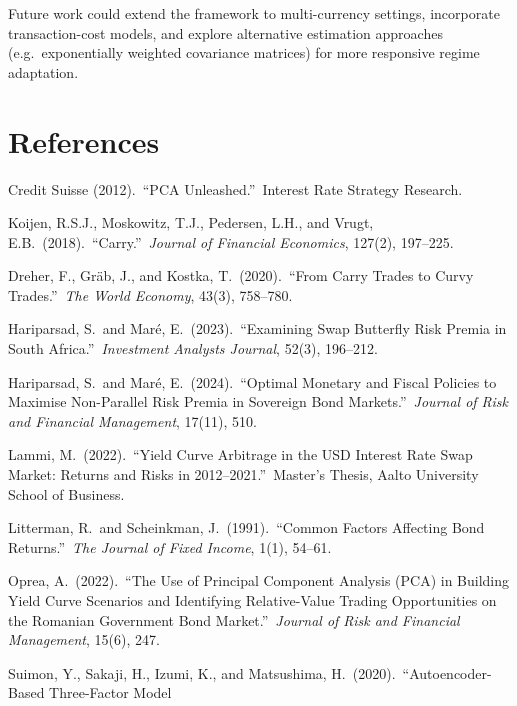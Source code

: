 \documentclass[11pt,a4paper]{article}
\begin{document}
Future work could extend the framework to multi-currency settings,
incorporate transaction-cost models, and explore alternative estimation
approaches (e.g.\ exponentially weighted covariance matrices) for more
responsive regime adaptation.


\section*{References}

\begin{enumerate}[label={[\arabic*]},leftmargin=*,itemsep=2pt]
  \item Credit Suisse (2012).\ ``PCA Unleashed.''\ Interest Rate Strategy
        Research.
  \item Koijen, R.S.J., Moskowitz, T.J., Pedersen, L.H., and Vrugt, E.B.~(2018).\
        ``Carry.''\ \textit{Journal of Financial Economics}, 127(2), 197--225.
  \item Dreher, F., Gr\"{a}b, J., and Kostka, T.~(2020).\ ``From Carry
        Trades to Curvy Trades.''\ \textit{The World Economy}, 43(3),
        758--780.
  \item Hariparsad, S.\ and Mar\'{e}, E.~(2023).\ ``Examining Swap Butterfly
        Risk Premia in South Africa.''\ \textit{Investment Analysts
        Journal}, 52(3), 196--212.
  \item Hariparsad, S.\ and Mar\'{e}, E.~(2024).\ ``Optimal Monetary and
        Fiscal Policies to Maximise Non-Parallel Risk Premia in Sovereign
        Bond Markets.''\ \textit{Journal of Risk and Financial
        Management}, 17(11), 510.
  \item Lammi, M.~(2022).\ ``Yield Curve Arbitrage in the USD Interest
        Rate Swap Market: Returns and Risks in 2012--2021.''\ Master's
        Thesis, Aalto University School of Business.
  \item Litterman, R.\ and Scheinkman, J.~(1991).\ ``Common Factors
        Affecting Bond Returns.''\ \textit{The Journal of Fixed Income},
        1(1), 54--61.
  \item Oprea, A.~(2022).\ ``The Use of Principal Component Analysis (PCA)
        in Building Yield Curve Scenarios and Identifying Relative-Value
        Trading Opportunities on the Romanian Government Bond Market.''\
        \textit{Journal of Risk and Financial Management}, 15(6), 247.
  \item Suimon, Y., Sakaji, H., Izumi, K., and
        Matsushima, H.~(2020).\ ``Autoencoder-Based Three-Factor Model

\end{enumerate}
\end{document}
